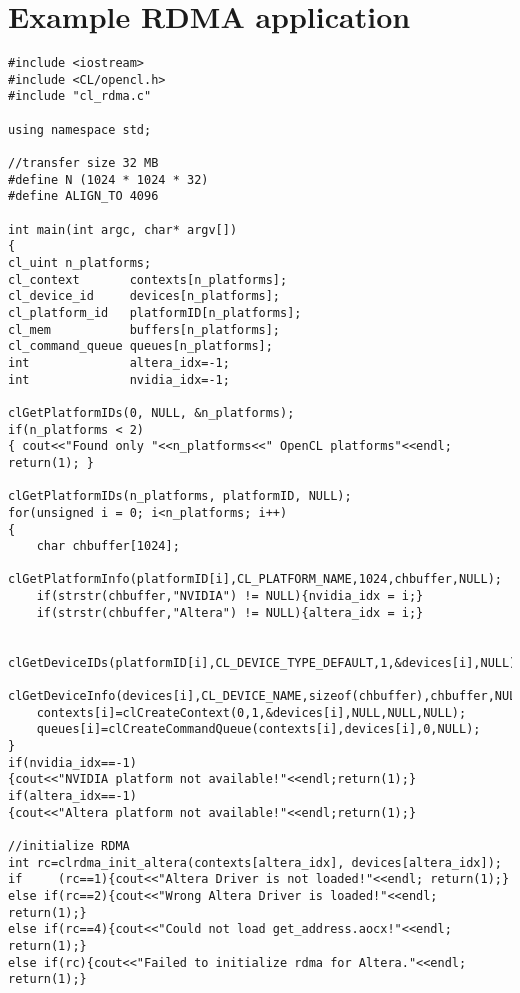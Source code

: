 \chapter{Example RDMA application}


\label{chapter:appendixA}



\begin{lstlisting}[label=listing:appendixA, caption={}, morekeywords={clrdma_init_altera, clrdma_init_nvidia, clrdma_create_pinnable_buffer_nvidia, clrdma_get_buffer_address_altera, clrdma_get_buffer_address_nvidia, read_rdma, cl_rdma}]
#include <iostream>
#include <CL/opencl.h>
#include "cl_rdma.c"

using namespace std;

//transfer size 32 MB
#define N (1024 * 1024 * 32)
#define ALIGN_TO 4096

int main(int argc, char* argv[])
{
cl_uint n_platforms;
cl_context       contexts[n_platforms];
cl_device_id     devices[n_platforms];
cl_platform_id   platformID[n_platforms];
cl_mem           buffers[n_platforms];
cl_command_queue queues[n_platforms];
int              altera_idx=-1;
int              nvidia_idx=-1;

clGetPlatformIDs(0, NULL, &n_platforms);
if(n_platforms < 2)
{ cout<<"Found only "<<n_platforms<<" OpenCL platforms"<<endl; return(1); }

clGetPlatformIDs(n_platforms, platformID, NULL);
for(unsigned i = 0; i<n_platforms; i++)
{
	char chbuffer[1024];
	clGetPlatformInfo(platformID[i],CL_PLATFORM_NAME,1024,chbuffer,NULL);
	if(strstr(chbuffer,"NVIDIA") != NULL){nvidia_idx = i;}
	if(strstr(chbuffer,"Altera") != NULL){altera_idx = i;}
	
	clGetDeviceIDs(platformID[i],CL_DEVICE_TYPE_DEFAULT,1,&devices[i],NULL);
	clGetDeviceInfo(devices[i],CL_DEVICE_NAME,sizeof(chbuffer),chbuffer,NULL);
	contexts[i]=clCreateContext(0,1,&devices[i],NULL,NULL,NULL);
	queues[i]=clCreateCommandQueue(contexts[i],devices[i],0,NULL);
}
if(nvidia_idx==-1)
{cout<<"NVIDIA platform not available!"<<endl;return(1);}
if(altera_idx==-1)
{cout<<"Altera platform not available!"<<endl;return(1);}

//initialize RDMA
int rc=clrdma_init_altera(contexts[altera_idx], devices[altera_idx]);
if     (rc==1){cout<<"Altera Driver is not loaded!"<<endl; return(1);}
else if(rc==2){cout<<"Wrong Altera Driver is loaded!"<<endl; return(1);}
else if(rc==4){cout<<"Could not load get_address.aocx!"<<endl; return(1);}
else if(rc){cout<<"Failed to initialize rdma for Altera."<<endl; return(1);}


\end{lstlisting}
